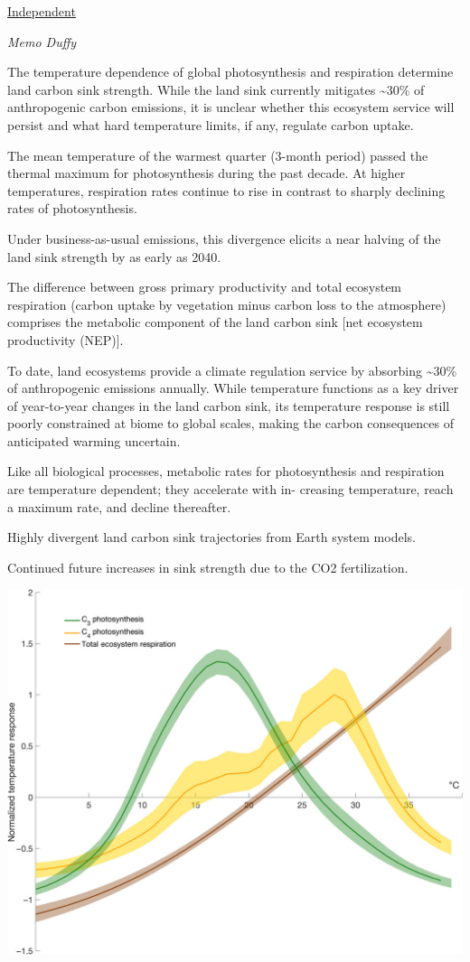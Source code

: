 \documentclass[
]{book}
\begin{document}
\href{https://www.independent.co.uk/environment/climate-change/land-ecosystems-tipping-point-temperature-b1786822.html}{Independent}

\emph{Memo Duffy}

The temperature dependence of global photosynthesis and respiration
determine land carbon sink strength.
While the land sink currently mitigates \textasciitilde30\% of anthropogenic carbon emissions,
it is unclear whether this ecosystem service will persist and
what hard temperature limits, if any, regulate carbon uptake.

The mean temperature of the warmest quarter (3-month period)
passed the thermal maximum for photosynthesis during the past decade.
At higher temperatures, respiration rates continue to rise
in contrast to sharply declining rates of photosynthesis.

Under business-as-usual emissions, this divergence elicits a
near halving of the land sink strength by as early as 2040.

The difference between gross primary productivity
and total ecosystem respiration
(carbon uptake by vegetation minus carbon loss to the atmosphere)
comprises the metabolic component of the land carbon
sink {[}net ecosystem productivity (NEP){]}.

To date, land ecosystems provide a climate regulation service
by absorbing \textasciitilde30\% of anthropogenic emissions annually.
While temperature functions as a key driver
of year-to-year changes in the land carbon sink,
its temperature response is still poorly constrained at biome to global scales,
making the carbon consequences of anticipated warming uncertain.

Like all biological processes, metabolic rates for photosynthesis
and respiration are temperature dependent; they accelerate with in-
creasing temperature, reach a maximum rate, and decline thereafter.

Highly divergent land carbon sink trajectories from Earth system models.

Continued future increases in sink strength due to the CO2 fertilization.

\includegraphics{fig/Photosythesis_Temp_Response.jpg}
\end{document}
